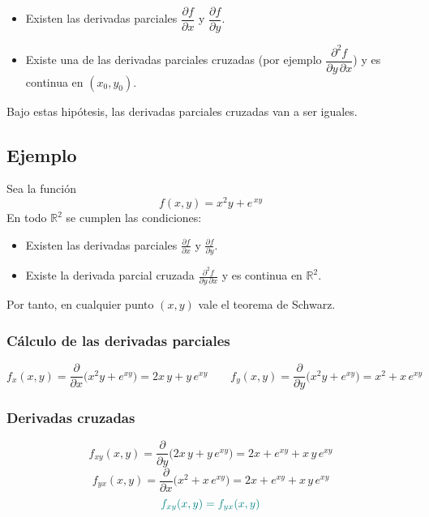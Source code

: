 \documentclass{article}
\begin{document}
\begin{itemize}
  \item Existen las derivadas parciales \(\dfrac{\partial f}{\partial x}\) y \(\dfrac{\partial f}{\partial y}\).
  \item Existe una de las derivadas parciales cruzadas (por ejemplo 
    \(\dfrac{\partial^{2}f}{\partial y\,\partial x}\)) y es continua en \((x_{0},y_{0})\).
\end{itemize}
Bajo estas hipótesis, las derivadas parciales cruzadas van a ser iguales.

\subsection*{Ejemplo}

Sea la función  
\[
f(x,y)=x^{2}y + e^{\,x y}
\]
En todo \(\mathbb{R}^{2}\) se cumplen las condiciones:
\begin{itemize}
  \item Existen las derivadas parciales
    \(\displaystyle \frac{\partial f}{\partial x}\) y 
    \(\displaystyle \frac{\partial f}{\partial y}\).
  \item Existe la derivada parcial cruzada 
    \(\displaystyle \frac{\partial^{2}f}{\partial y\,\partial x}\)
    y es continua en \(\mathbb{R}^{2}\).
\end{itemize}
Por tanto, en cualquier punto \((x,y)\) vale el teorema de Schwarz.


\subsubsection*{Cálculo de las derivadas parciales}

\[
f_{x}(x,y)
=\frac{\partial}{\partial x}\bigl(x^{2}y + e^{xy}\bigr)
=2x\,y + y\,e^{xy}
\qquad
f_{y}(x,y)
=\frac{\partial}{\partial y}\bigl(x^{2}y + e^{xy}\bigr)
=x^{2} + x\,e^{xy}
\]

\subsubsection*{Derivadas cruzadas}

\[
f_{xy}(x,y)
=\frac{\partial}{\partial y}\bigl(2x\,y + y\,e^{xy}\bigr)
=2x + e^{xy} + x\,y\,e^{xy}
\]
\[
f_{yx}(x,y)
=\frac{\partial}{\partial x}\bigl(x^{2} + x\,e^{xy}\bigr)
=2x + e^{xy} + x\,y\,e^{xy}
\]
\[
\color{teal}
f_{xy}(x,y)=f_{yx}(x,y)
\]





\newpage
\end{document}
